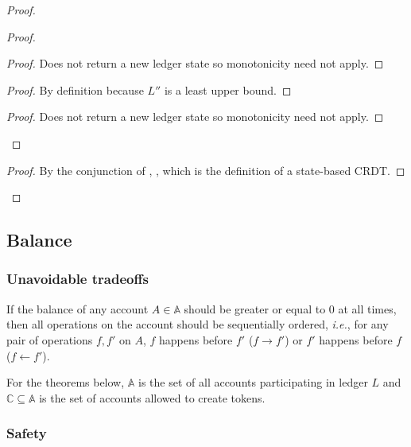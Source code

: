 \documentclass[9pt, oneside]{article}   	%
\begin{document}
\begin{proof}
\begin{proof}
		\begin{proof}
			Does not return a new ledger state so monotonicity need not apply.
		\end{proof}
			
		\begin{proof}
		 	By definition because $L''$ is a least upper bound.
		\end{proof}
			
		\begin{proof}
			Does not return a new ledger state so monotonicity need not apply.
		\end{proof}

	\end{proof}

	
	\qedstep
	\begin{proof}
		By the conjunction of , ,  which is the definition of a state-based CRDT.
	\end{proof}
\end{proof}

\subsection{Balance}
\label{sec:proof:balance}

\subsubsection{Unavoidable tradeoffs}

\label{proof:positive-bal-seq-order}
If the balance of any account $A \in \mathds{A}$ should be greater or equal to 0 at all times, then all operations on the account should be sequentially ordered, \textit{i.e.}, for any pair of operations $f,f'$ on $A$, $f$ happens before $f'$ ($f \rightarrow f'$) or $f'$ happens before $f$ ($f \leftarrow f'$).


For the theorems below, $\mathds{A}$ is the set of all accounts participating in ledger $L$ and $\mathds{C} \subseteq \mathds{A}$ is the set of accounts allowed to create tokens.

\subsubsection{Safety}
\end{document}
